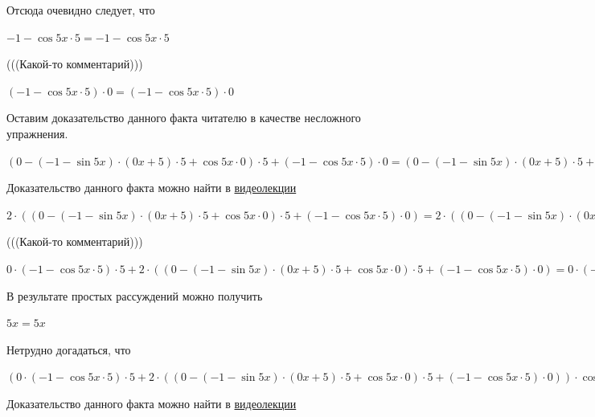 \documentclass[12pt,a4paper,fleqn]{article}
\theoremstyle{definition}
\begin{document}
Отсюда очевидно следует, что 

$ -1  - \cos 5  x  \cdot  5  =  -1  - \cos 5  x  \cdot  5 $

(((Какой-то комментарий))) 

$( -1  - \cos 5  x  \cdot  5 ) \cdot  0  = ( -1  - \cos 5  x  \cdot  5 ) \cdot  0 $

Оставим доказательство данного факта читателю в качестве несложного упражнения. 

$( 0  - ( -1  - \sin 5  x ) \cdot ( 0  x  +  5 ) \cdot  5  + \cos 5  x  \cdot  0 ) \cdot  5  + ( -1  - \cos 5  x  \cdot  5 ) \cdot  0  = ( 0  - ( -1  - \sin 5  x ) \cdot ( 0  x  +  5 ) \cdot  5  + \cos 5  x  \cdot  0 ) \cdot  5  + ( -1  - \cos 5  x  \cdot  5 ) \cdot  0 $

Доказательство данного факта можно найти в \href{https://www.youtube.com/watch?v=dQw4w9WgXcQ}{видеолекции} 

$ 2  \cdot (( 0  - ( -1  - \sin 5  x ) \cdot ( 0  x  +  5 ) \cdot  5  + \cos 5  x  \cdot  0 ) \cdot  5  + ( -1  - \cos 5  x  \cdot  5 ) \cdot  0 ) =  2  \cdot (( 0  - ( -1  - \sin 5  x ) \cdot ( 0  x  +  5 ) \cdot  5  + \cos 5  x  \cdot  0 ) \cdot  5  + ( -1  - \cos 5  x  \cdot  5 ) \cdot  0 )$

(((Какой-то комментарий))) 

$ 0  \cdot ( -1  - \cos 5  x  \cdot  5 ) \cdot  5  +  2  \cdot (( 0  - ( -1  - \sin 5  x ) \cdot ( 0  x  +  5 ) \cdot  5  + \cos 5  x  \cdot  0 ) \cdot  5  + ( -1  - \cos 5  x  \cdot  5 ) \cdot  0 ) =  0  \cdot ( -1  - \cos 5  x  \cdot  5 ) \cdot  5  +  2  \cdot (( 0  - ( -1  - \sin 5  x ) \cdot ( 0  x  +  5 ) \cdot  5  + \cos 5  x  \cdot  0 ) \cdot  5  + ( -1  - \cos 5  x  \cdot  5 ) \cdot  0 )$

В результате простых рассуждений можно получить 

$ 5  x  =  5  x $

Нетрудно догадаться, что 

$( 0  \cdot ( -1  - \cos 5  x  \cdot  5 ) \cdot  5  +  2  \cdot (( 0  - ( -1  - \sin 5  x ) \cdot ( 0  x  +  5 ) \cdot  5  + \cos 5  x  \cdot  0 ) \cdot  5  + ( -1  - \cos 5  x  \cdot  5 ) \cdot  0 )) \cdot \cos 5  x  = ( 0  \cdot ( -1  - \cos 5  x  \cdot  5 ) \cdot  5  +  2  \cdot (( 0  - ( -1  - \sin 5  x ) \cdot ( 0  x  +  5 ) \cdot  5  + \cos 5  x  \cdot  0 ) \cdot  5  + ( -1  - \cos 5  x  \cdot  5 ) \cdot  0 )) \cdot \cos 5  x $

Доказательство данного факта можно найти в \href{https://www.youtube.com/watch?v=dQw4w9WgXcQ}{видеолекции} 
\end{document}
